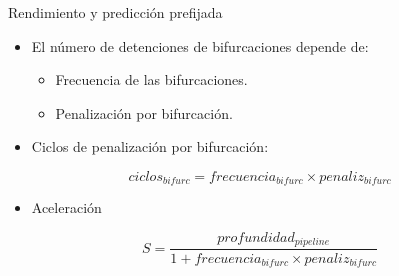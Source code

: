 \begin{frame}[t]{Rendimiento y predicción prefijada}
\begin{itemize}
  \item El número de detenciones de bifurcaciones depende de:
    \begin{itemize}
      \item Frecuencia de las bifurcaciones.
      \item Penalización por bifurcación.
    \end{itemize}
\end{itemize}
\begin{itemize}
  \item Ciclos de penalización por bifurcación:
\end{itemize}
\begin{displaymath}
ciclos_{bifurc} = frecuencia_{bifurc} \times penaliz_{bifurc}
\end{displaymath}
\begin{itemize}
  \item Aceleración
\end{itemize}
\begin{displaymath}
S =
\frac{profundidad_{pipeline}}{1 + frecuencia_{bifurc} \times penaliz_{bifurc}}
\end{displaymath}
\end{frame}


